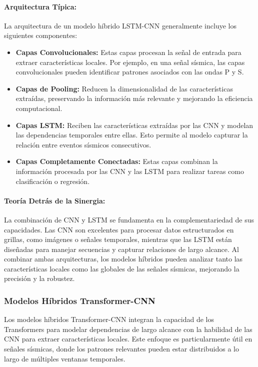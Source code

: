 \paragraph{Arquitectura Típica:}
La arquitectura de un modelo híbrido LSTM-CNN generalmente incluye los siguientes componentes:
\begin{itemize}
    \item \textbf{Capas Convolucionales:} Estas capas procesan la señal de entrada para extraer características locales. Por ejemplo, en una señal sísmica, las capas convolucionales pueden identificar patrones asociados con las ondas P y S.
    \item \textbf{Capas de Pooling:} Reducen la dimensionalidad de las características extraídas, preservando la información más relevante y mejorando la eficiencia computacional.
    \item \textbf{Capas LSTM:} Reciben las características extraídas por las CNN y modelan las dependencias temporales entre ellas. Esto permite al modelo capturar la relación entre eventos sísmicos consecutivos.
    \item \textbf{Capas Completamente Conectadas:} Estas capas combinan la información procesada por las CNN y las LSTM para realizar tareas como clasificación o regresión.
\end{itemize}

\paragraph{Teoría Detrás de la Sinergia:}
La combinación de CNN y LSTM se fundamenta en la complementariedad de sus capacidades. Las CNN son excelentes para procesar datos estructurados en grillas, como imágenes o señales temporales, mientras que las LSTM están diseñadas para manejar secuencias y capturar relaciones de largo alcance. Al combinar ambas arquitecturas, los modelos híbridos pueden analizar tanto las características locales como las globales de las señales sísmicas, mejorando la precisión y la robustez.

\subsubsection{Modelos Híbridos Transformer-CNN}

Los modelos híbridos Transformer-CNN integran la capacidad de los Transformers para modelar dependencias de largo alcance con la habilidad de las CNN para extraer características locales. Este enfoque es particularmente útil en señales sísmicas, donde los patrones relevantes pueden estar distribuidos a lo largo de múltiples ventanas temporales.

